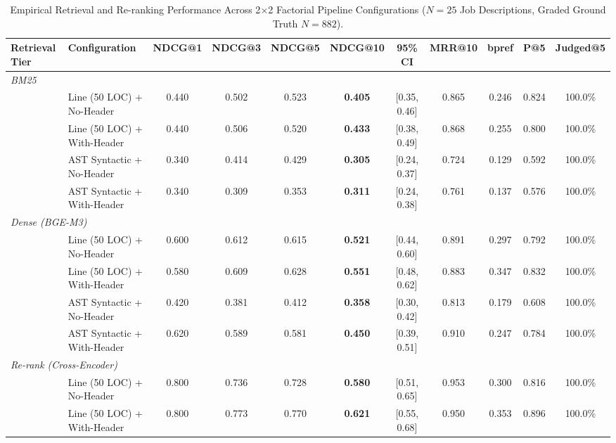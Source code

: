 \begin{table}[t]
\centering
\small
\caption{Empirical Retrieval and Re-ranking Performance Across 2$\times$2 Factorial Pipeline Configurations ($N=25$ Job Descriptions, Graded Ground Truth $N=882$).}
\label{tab:main_retrieval_benchmark}\label{tab:retrieval_2x2}
\begin{tabular}{llccccccccc}
\toprule
\textbf{Retrieval Tier} & \textbf{Configuration} & \textbf{NDCG@1} & \textbf{NDCG@3} & \textbf{NDCG@5} & \textbf{NDCG@10} & \textbf{95\% CI} & \textbf{MRR@10} & \textbf{bpref} & \textbf{P@5} & \textbf{Judged@5} \\
\midrule
\multicolumn{11}{l}{\textit{BM25}} \\
  & Line (50 LOC) + No-Header      & 0.440 & 0.502 & 0.523 & \textbf{0.405} & [0.35, 0.46] & 0.865 & 0.246 & 0.824 & 100.0\% \\
  & Line (50 LOC) + With-Header    & 0.440 & 0.506 & 0.520 & \textbf{0.433} & [0.38, 0.49] & 0.868 & 0.255 & 0.800 & 100.0\% \\
  & AST Syntactic + No-Header      & 0.340 & 0.414 & 0.429 & \textbf{0.305} & [0.24, 0.37] & 0.724 & 0.129 & 0.592 & 100.0\% \\
  & AST Syntactic + With-Header    & 0.340 & 0.309 & 0.353 & \textbf{0.311} & [0.24, 0.38] & 0.761 & 0.137 & 0.576 & 100.0\% \\
\midrule
\multicolumn{11}{l}{\textit{Dense (BGE-M3)}} \\
  & Line (50 LOC) + No-Header      & 0.600 & 0.612 & 0.615 & \textbf{0.521} & [0.44, 0.60] & 0.891 & 0.297 & 0.792 & 100.0\% \\
  & Line (50 LOC) + With-Header    & 0.580 & 0.609 & 0.628 & \textbf{0.551} & [0.48, 0.62] & 0.883 & 0.347 & 0.832 & 100.0\% \\
  & AST Syntactic + No-Header      & 0.420 & 0.381 & 0.412 & \textbf{0.358} & [0.30, 0.42] & 0.813 & 0.179 & 0.608 & 100.0\% \\
  & AST Syntactic + With-Header    & 0.620 & 0.589 & 0.581 & \textbf{0.450} & [0.39, 0.51] & 0.910 & 0.247 & 0.784 & 100.0\% \\
\midrule
\multicolumn{11}{l}{\textit{Re-rank (Cross-Encoder)}} \\
  & Line (50 LOC) + No-Header      & 0.800 & 0.736 & 0.728 & \textbf{0.580} & [0.51, 0.65] & 0.953 & 0.300 & 0.816 & 100.0\% \\
  & Line (50 LOC) + With-Header    & 0.800 & 0.773 & 0.770 & \textbf{0.621} & [0.55, 0.68] & 0.950 & 0.353 & 0.896 & 100.0\% \\

\end{tabular}
\end{table}
